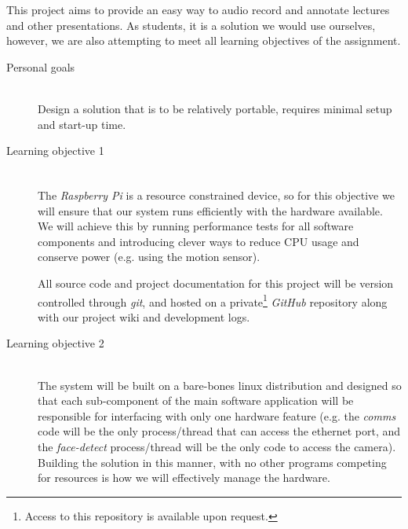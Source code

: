 \documentclass[11pt,a4paper,titlepage]{report}
\newcommand{\rpi}{\textit{Raspberry Pi\textsuperscript{\textregistered}}}
\begin{document}
This project aims to provide an easy way to audio record and annotate lectures and other presentations. As students, it is a solution we would use ourselves, however, we are also attempting to meet all learning objectives of the assignment.

\begin{description}
   
  \item[Personal goals] \hfill \\
      Design a solution that is to be relatively portable, requires minimal setup and start-up time. 
      
  \item[Learning objective 1] \hfill \\
The \rpi\xspace is a resource constrained device, so for this objective we will ensure that our system runs efficiently with the hardware available. We will achieve this by running performance tests for all software components and introducing clever ways to reduce CPU usage and conserve power (e.g. using the motion sensor).

All source code and project documentation for this project will be version controlled through \textit{git}, and hosted on a private\footnote{Access to this repository is available upon request.} \textit{GitHub} repository along with our project wiki and development logs.

  \item[Learning objective 2] \hfill \\
The system will be built on a bare-bones linux distribution and designed so that each sub-component of the main software application will be responsible for interfacing with only one hardware feature (e.g. the \textit{comms} code will be the only process/thread that can access the ethernet port, and the \textit{face-detect} process/thread will be the only code to access the camera). Building the solution in this manner, with no other programs competing for resources is how we will effectively manage the hardware.


\end{description}
\end{document}
